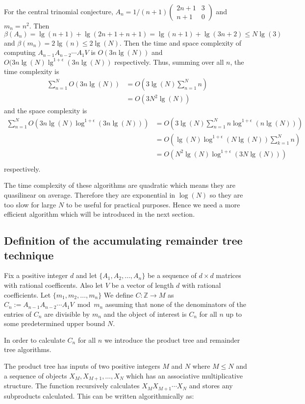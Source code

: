 For the central trinomial conjecture, $A_n=1/(n+1) \begin{pmatrix} 2n+1 & 3 \\n+1 & 0 \end{pmatrix}$ and $ m_n=n^2$. Then $\beta(A_n)=\lg(n+1)+\lg(2n+1+n+1)=\lg(n+1)+\lg(3n+2)\leq N\lg(3)$ and $\beta(m_n)=2\lg(n)\leq 2\lg(N)$. Then the time and space complexity of computing $A_{n-1} A_{n-2}\cdots A_{1} V$ is $O(3n\lg(N))$ and $O(3n\lg(N)\lg^{1+\epsilon}(3n\lg(N))$ respectively. Thus, summing over all $n$, the time complexity is 
\begin{align*} \sum_{n=1}^{N} O(3n\lg(N)) &= O(3\lg(N)\sum_{n=1}^{N} n) \\
&=O(3N^2\lg(N)) \end{align*} and the space complexity is 
\begin{align*} \sum_{n=1}^{N} O(3n\lg(N)\log^{1+\epsilon}(3n\lg(N))) &= O(3\lg(N)\sum_{n=1}^{N}n\log^{1+\epsilon}(n\lg(N)))\\
 &=O(\lg(N)\log^{1+\epsilon}(N\lg(N))\sum_{k=1}^{N} n) \\
 &=O(N^{2}\lg(N)\log^{1+\epsilon}(3N\lg(N)) ) \\
 \end{align*} respectively. 

The time complexity of these algorithms are quadratic which means they are quasilinear on average. Therefore they are exponential in $\log(N)$ so they are too slow for large $N$ to be useful for practical purposes. Hence we need a more efficient algorithm which will be introduced in the next section.    
 
\subsection{Definition of the accumulating remainder tree technique}

Fix a positive integer $d$ and let $\{A_1,A_2,\dots,A_n\}$ be a sequence of $d\times d$ matrices with rational coefficents. Also let $V$ be a vector of length $d$ with rational coefficients. Let $\{m_1,m_2,\dots,m_{n}\}$  We define $C:\mathbb{Z}\to M$ as $C_n:= A_{n-1} A_{n-2} \cdots A_{1} V \bmod m_n$ assuming that none of the denominators of the entries of $C_n$ are divisible by $m_n$ and the object of interest is $C_n$ for all $n$ up to some predetermined upper bound $N$.

In order to calculate $C_n$ for all $n$ we introduce the product tree and remainder tree algorithms.

The product tree has inputs of two positive integers $M$ and $N$ where $M\leq N$ and a sequence of objects $X_M, X_{M+1},\dots,X_{N}$ which has an associative multiplicative structure. The function recursively calculates $X_M X_{M+1}\cdots X_N$ and stores any subproducts calculated. This can be written algorithmically as:

